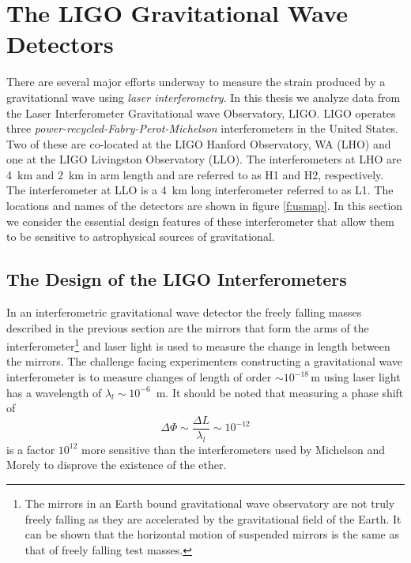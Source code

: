 \section{The LIGO Gravitational Wave Detectors}
\label{s:ifos}

There are several major efforts
underway\cite{Barish:1999,Acernese:2002,Luck:1997hv} to measure the strain
produced by a gravitational wave using \emph{laser interferometry}. In this
thesis we analyze data from the Laser Interferometer Gravitational wave
Observatory, LIGO. LIGO operates three
\emph{power-recycled-Fabry-Perot-Michelson} interferometers in the United
States. Two of these are co-located at the LIGO Hanford Observatory, WA (LHO)
and one at the LIGO Livingston Observatory (LLO). The interferometers at 
LHO are 4~km and 2~km in arm length and are referred to as H1 and H2,
respectively. The interferometer at LLO is a 4~km long interferometer
referred to as L1. The locations and names of the detectors are shown in
figure \ref{f:usmap}.  In this section we consider the essential design
features of these interferometer that allow them to be sensitive to
astrophysical sources of gravitational.

\subsection{The Design of the LIGO Interferometers}
\label{ss:ligoifos}

In an interferometric gravitational wave detector the freely falling masses
described in the previous section are the mirrors that form the arms of the
interferometer\footnote{The mirrors in an Earth bound gravitational wave
observatory are not truly freely falling as they are accelerated by the
gravitational field of the Earth. It can be shown that the horizontal motion
of suspended mirrors is the same as that of freely falling test masses.} and
laser light is used to measure the change in length between the mirrors.  The
challenge facing experimenters constructing a gravitational wave
interferometer is to measure changes of length of order $\sim
10^{-18}\,\mathrm{m}$ using laser light has a wavelength of $\lambda_l \sim
10^{-6}$~m.  It should be noted that measuring a phase shift of
\begin{equation}
\Delta \Phi \sim \frac{\Delta L}{\lambda_l} \sim 10^{-12}
\end{equation}
is a factor $10^{12}$ more sensitive than the interferometers used by
Michelson and Morely to disprove the existence of the ether.

